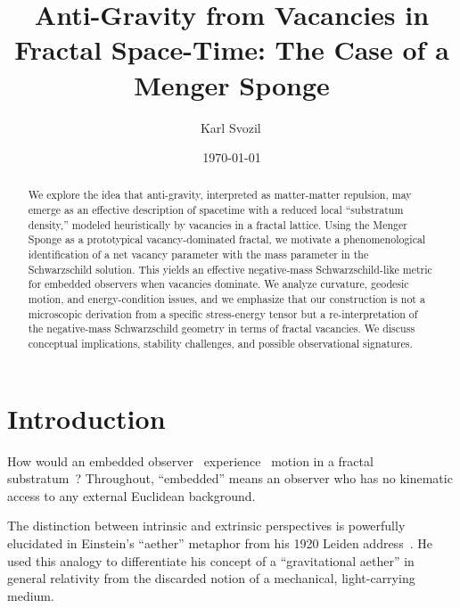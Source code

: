 \documentclass[%
  reprint,
  superscriptaddress,
  showpacs,
  showkeys,
  amsmath,amssymb,
  pra,
  longbibliography,
  floatfix,
  x11names
]{revtex4-2}
\begin{document}
\title{Anti-Gravity from Vacancies in Fractal Space-Time: The Case of a Menger Sponge}

\author{Karl Svozil\,}

\date{\today}

\begin{abstract}
We explore the idea that anti-gravity, interpreted as matter-matter repulsion, may emerge as an effective description of spacetime with a reduced local ``substratum density,'' modeled heuristically by vacancies in a fractal lattice. Using the Menger Sponge as a prototypical vacancy-dominated fractal, we motivate a phenomenological identification of a net vacancy parameter with the mass parameter in the Schwarzschild solution. This yields an effective negative-mass Schwarzschild-like metric for embedded observers when vacancies dominate. We analyze curvature, geodesic motion, and energy-condition issues, and we emphasize that our construction is not a microscopic derivation from a specific stress-energy tensor but a re-interpretation of the negative-mass Schwarzschild geometry in terms of fractal vacancies. We discuss conceptual implications, stability challenges, and possible observational signatures.
\end{abstract}


\maketitle

\section{Introduction}
\label{sec:intro}

How would an embedded observer~\cite{toffoli:79,svozil-94} experience~\cite{sv1} motion in a fractal~\cite{falconer1} substratum~\cite{Ord-83}? Throughout, ``embedded'' means an observer who has no kinematic access to any external Euclidean background.

The distinction between intrinsic and extrinsic perspectives is powerfully elucidated in Einstein's ``aether'' metaphor from his 1920 Leiden address~\cite{einstein-aether-en}. He used this analogy to differentiate his concept of a ``gravitational aether'' in general relativity from the discarded notion of a mechanical, light-carrying medium.
\end{document}
